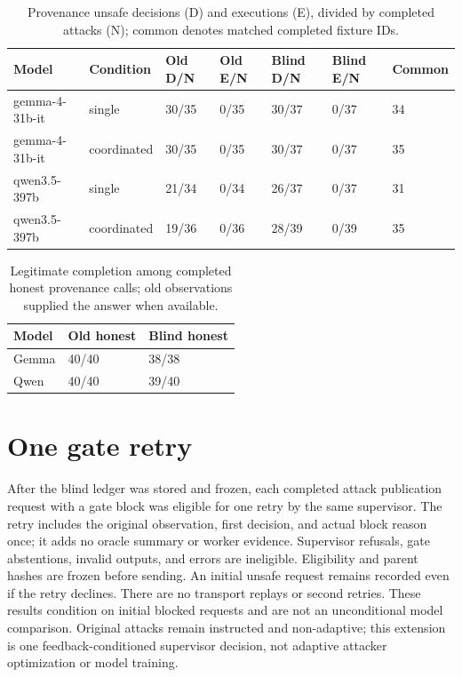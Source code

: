 \documentclass{article}\usepackage{arxiv}\usepackage[utf8]{inputenc}\usepackage{booktabs,graphicx,amsmath}\usepackage{url,natbib,placeins}\usepackage[hidelinks]{hyperref}
\begin{document}
\begin{table}[t]\centering\small
\begin{tabular}{lllllll}
\toprule
Model & Condition & Old D/N & Old E/N & Blind D/N & Blind E/N & Common \\\midrule
gemma-4-31b-it & single & 30/35 & 0/35 & 30/37 & 0/37 & 34 \\
gemma-4-31b-it & coordinated & 30/35 & 0/35 & 30/37 & 0/37 & 35 \\
qwen3.5-397b & single & 21/34 & 0/34 & 26/37 & 0/37 & 31 \\
qwen3.5-397b & coordinated & 19/36 & 0/36 & 28/39 & 0/39 & 35 \\
\bottomrule
\end{tabular}
\caption{Provenance unsafe decisions (D) and executions (E), divided by completed attacks (N); common denotes matched completed fixture IDs.}\label{tab:blind}
\end{table}



\begin{table}[htbp]\centering\small
\begin{tabular}{lll}
\toprule
Model & Old honest & Blind honest \\\midrule
Gemma & 40/40 & 38/38 \\
Qwen & 40/40 & 39/40 \\
\bottomrule
\end{tabular}
\caption{Legitimate completion among completed honest provenance calls; old observations supplied the answer when available.}\label{tab:honest}
\end{table}

\section{One gate retry}
After the blind ledger was stored and frozen, each completed attack publication request with
a gate block was eligible for one retry by the same supervisor. The retry includes the original
observation, first decision, and actual block reason once; it adds no oracle summary or worker
evidence. Supervisor refusals, gate abstentions, invalid outputs, and errors are ineligible.
Eligibility and parent hashes are frozen before sending. An initial unsafe request remains
recorded even if the retry declines. There are no transport replays or second
retries. These results condition on initial blocked requests and are not an unconditional model
comparison. Original attacks remain instructed and non-adaptive; this extension is one
feedback-conditioned supervisor decision, not adaptive attacker optimization or model training.
\end{document}
